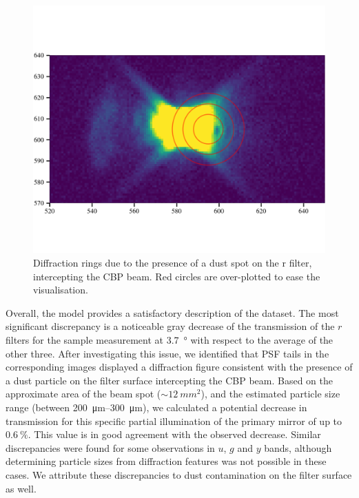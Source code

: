 \begin{figure}
  \centering
  \includegraphics[width=1\linewidth]{fig/diffraction_dust.png}
  \caption{Diffraction rings due to the presence of a dust spot on the
    r filter, intercepting the CBP beam. Red circles are over-plotted
    to ease the visualisation.}
  \label{fig:dust}
\end{figure}


Overall, the model provides a satisfactory description of the
dataset. The most significant discrepancy is a noticeable gray
decrease of the transmission of the $r$ filters for the sample
measurement at \SI{3.7}{\degree} with respect to the average of the
other three.  After investigating this issue, we identified that PSF
tails in the corresponding images displayed a diffraction figure
consistent with the presence of a dust particle
on the filter surface intercepting the CBP beam.
Based on the approximate area of the beam spot
($\sim\SI{12}{mm^2}$), and the estimated particle size range (between
\SIrange{200}{300}{\micro\metre}), we calculated a potential decrease
in transmission for this specific partial illumination of the primary
mirror of up to ~$\SI{0.6}{\percent}$. This value is in good agreement
with the observed decrease. Similar discrepancies were found for some
observations in $u$, $g$ and $y$ bands, although determining particle
sizes from diffraction features was not possible in these cases. We
attribute these discrepancies to dust contamination on the filter
surface as well.

